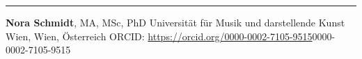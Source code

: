 \begin{center}\rule{0.5\linewidth}{0.5pt}\end{center}

\textbf{Nora Schmidt}, MA, MSc, PhD \textbar{} Universität für Musik
und darstellende Kunst Wien, Wien, Österreich \textbar ORCID:
\url{https://orcid.org/0000-0002-7105-9515}{0000-0002-7105-9515}
